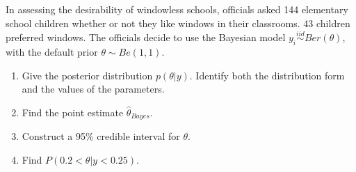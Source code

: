   \item 
    In assessing the desirability of windowless schools, officials asked 144
    elementary school children whether or not they like windows in their
    classrooms. 43 children preferred windows. The officials decide to use the Bayesian model $y_i\stackrel{iid}{\sim}Ber(\theta)$, with the default prior $\theta \sim Be(1,1)$.
    \begin{enumerate}
      \item Give the posterior distribution $ p(\theta | y)$. Identify both the distribution form and the values of the parameters. 
      \item Find the point estimate $\hat{\theta}_{Bayes}$. 
      \item Construct a 95\% credible interval for $\theta$. 
      \item Find $P(0.2<\theta| y <0.25)$.
\end{enumerate}

